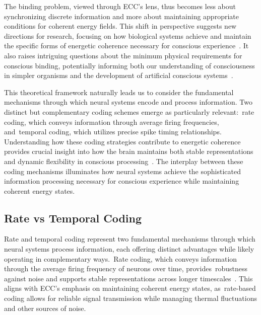 The binding problem, viewed through ECC's lens, thus becomes less about synchronizing discrete information and more about maintaining appropriate conditions for coherent energy fields. This shift in perspective suggests new directions for research, focusing on how biological systems achieve and maintain the specific forms of energetic coherence necessary for conscious experience~\cite{kelso2012}. It also raises intriguing questions about the minimum physical requirements for conscious binding, potentially informing both our understanding of consciousness in simpler organisms and the development of artificial conscious systems~\cite{hunt2024electromagnetic}.

This theoretical framework naturally leads us to consider the fundamental mechanisms through which neural systems encode and process information. Two distinct but complementary coding schemes emerge as particularly relevant:~rate coding, which conveys information through average firing frequencies, and~temporal coding, which utilizes precise spike timing relationships. Understanding how these coding strategies contribute to energetic coherence provides crucial insight into how the brain maintains both stable representations and dynamic flexibility in conscious processing~\cite{amil2024theta}. The interplay between these coding mechanisms illuminates how neural systems achieve the sophisticated information processing necessary for conscious experience while maintaining coherent energy states.

\subsection*{Rate vs Temporal Coding~}

Rate and temporal coding represent two fundamental mechanisms through which neural systems process information, each offering distinct advantages while likely operating in complementary ways.~Rate coding, which conveys information through the average firing frequency of neurons over time, provides~robustness against noise and supports stable representations across longer timescales~\cite{faisal2008}. This aligns with ECC's emphasis on maintaining coherent energy states, as~rate-based coding allows for reliable signal transmission while managing thermal fluctuations and other sources of noise.

